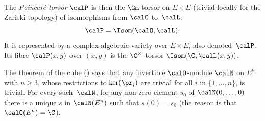 The \emph{Poincaré torsor} $\calP$ is then the $\Gm$-torsor on
$E\times E$ (trivial locally for the Zariski topology) of isomorphisms
from $\calO$ to~$\calL$:
\begin{equation}\label{eqn:defPtorsor}
\calP = \Isom(\calO,\calL).
\end{equation}
It is represented by a complex algebraic variety over $E\times E$,
also denoted~$\calP$. Its fibre $\calP(x,y)$ over $(x,y)$ is
the $\C^\times$-torsor $\Isom(\C,\calL(x,y))$.

The theorem of the cube (\cite[\S 6]{MumfordAV}) says that any
invertible $\calO$-module $\calN$ on $E^n$ with $n\geq3$, whose
restrictions to $\ker(\pr_i)$ are trivial for all $i$ in
$\{1,\ldots,n\}$, is trivial. For every such~$\calN$, for any non-zero
element $s_0$ of $\calN(0,\ldots,0)$ there is a unique $s$ in
$\calN(E^n)$ such that $s(0)=s_0$ (the reason is that
$\calO(E^n)=\C$).

